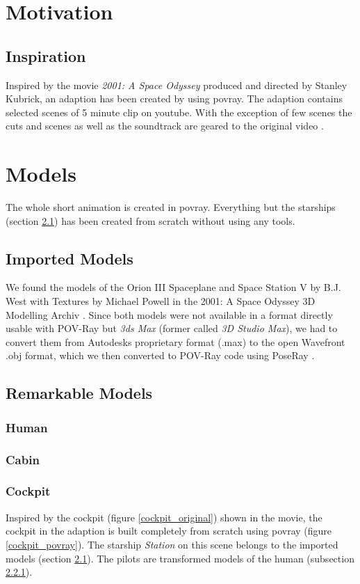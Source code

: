 
\chapter{Motivation}
\section{Inspiration}
Inspired by the movie \textit{2001: A Space Odyssey} produced and directed by Stanley Kubrick, an adaption has been created by using povray. The adaption contains selected scenes of 5 minute clip on youtube.  With the exception of few scenes the cuts and scenes as well as the soundtrack are geared to the original video  \cite{EbClectic}.

\chapter{Models}
The whole short animation is created in povray. Everything but the starships (section \ref{imported_models}) has been created from scratch without using any tools.

\section{Imported Models} \label{imported_models}

We found the models of the Orion III Spaceplane and Space Station V by B.J. West with Textures by Michael Powell in the 2001: A Space Odyssey 3D Modelling Archiv \cite{Archive}.
Since both models were not available in a format directly usable with POV-Ray but \textit{3ds Max} (former called \textit{3D Studio Max}), we had to convert them from Autodesks proprietary format (.max) to the open Wavefront .obj format, which we then converted to POV-Ray code using PoseRay \cite{PoseRay}.

\section{Remarkable Models}
\subsection{Human} \label{human_model}
\subsection{Cabin}
\newpage
\subsection{Cockpit} \label{cockpit_model}
Inspired by the cockpit (figure \ref{cockpit_original}) shown in the movie, the cockpit in the adaption  is built completely from scratch using povray (figure \ref{cockpit_povray}). The starship \textit{Station} on this scene belongs to the imported models (section \ref{imported_models}).
The pilots are transformed models of the human (subsection \ref{human_model}).

